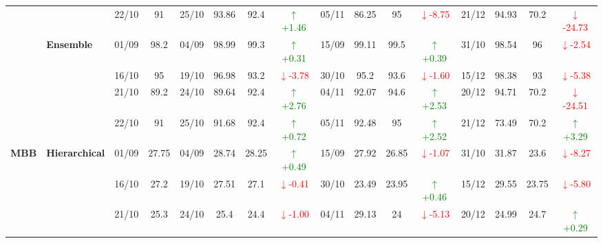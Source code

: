 {\begin{longtable}{llcc|cccc|cccc|cccc}
&
& 22/10 & 91 & 25/10 & 93.86 & 92.4 & \textcolor{green}{\(\uparrow\)+1.46} & 05/11 & 86.25 & 95 & \textcolor{red}{\(\downarrow\)-8.75} & 21/12 & 94.93 & 70.2 & \textcolor{red}{\(\downarrow\)-24.73} \\
\cmidrule(lr){2-16}


& \textbf{Ensemble}
& 01/09 & 98.2 & 04/09 & 98.99 & 99.3 & \textcolor{green}{\(\uparrow\)+0.31} & 15/09 & 99.11 & 99.5 & \textcolor{green}{\(\uparrow\)+0.39} & 31/10 & 98.54 & 96 & \textcolor{red}{\(\downarrow\)-2.54} \\

&
& 16/10 & 95 & 19/10 & 96.98 & 93.2 & \textcolor{red}{\(\downarrow\)-3.78} & 30/10 & 95.2 & 93.6 & \textcolor{red}{\(\downarrow\)-1.60} & 15/12 & 98.38 & 93 & \textcolor{red}{\(\downarrow\)-5.38} \\

&
& 21/10 & 89.2 & 24/10 & 89.64 & 92.4 & \textcolor{green}{\(\uparrow\)+2.76} & 04/11 & 92.07 & 94.6 & \textcolor{green}{\(\uparrow\)+2.53} & 20/12 & 94.71 & 70.2 & \textcolor{red}{\(\downarrow\)-24.51} \\

&
& 22/10 & 91 & 25/10 & 91.68 & 92.4 & \textcolor{green}{\(\uparrow\)+0.72} & 05/11 & 92.48 & 95 & \textcolor{green}{\(\uparrow\)+2.52} & 21/12 & 73.49 & 70.2 & \textcolor{green}{\(\uparrow\)+3.29} \\
\midrule



\multirow{12}{*}{\textbf{MBB}} 
& \textbf{Hierarchical}
& 01/09 & 27.75 & 04/09 & 28.74 & 28.25 & \textcolor{green}{\(\uparrow\)+0.49} & 15/09 & 27.92 & 26.85 & \textcolor{red}{\(\downarrow\)-1.07} & 31/10 & 31.87 & 23.6 & \textcolor{red}{\(\downarrow\)-8.27} \\

&
& 16/10 & 27.2 & 19/10 & 27.51 & 27.1 & \textcolor{red}{\(\downarrow\)-0.41} & 30/10 & 23.49 & 23.95 & \textcolor{green}{\(\uparrow\)+0.46} & 15/12 & 29.55 & 23.75 & \textcolor{red}{\(\downarrow\)-5.80} \\

&
& 21/10 & 25.3 & 24/10 & 25.4 & 24.4 & \textcolor{red}{\(\downarrow\)-1.00} & 04/11 & 29.13 & 24 & \textcolor{red}{\(\downarrow\)-5.13} & 20/12 & 24.99 & 24.7 & \textcolor{green}{\(\uparrow\)+0.29} \\


\end{longtable}}
